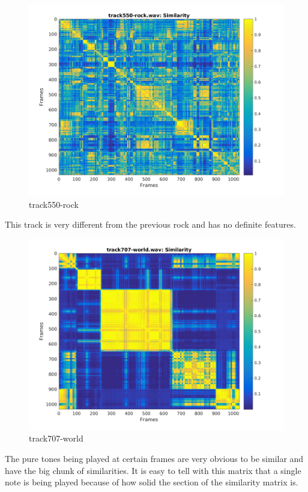 \documentclass[11pt, a4paper]{article}
\begin{document}
\begin{figure}[H]
    \centering
    \includegraphics[width=.8\textwidth]{track550-rock-similarity.png}
    \caption{track550-rock}
\end{figure}

This track is very different from the previous rock and has no definite features. 


\begin{figure}[H]
    \centering
    \includegraphics[width=.8\textwidth]{track707-world-similarity.png}
    \caption{track707-world}
\end{figure}

The pure tones being played at certain frames are very obvious to be similar and have the big chunk of similarities. It is easy to tell with this matrix that a single note is being played because of how solid the section of the similarity matrix is. 
\end{document}
